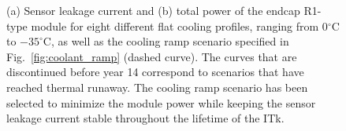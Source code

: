 \begin{figure}[ht]
\centering
{}\quad\quad
{}
\caption{(a) Sensor leakage current and (b) total power of the endcap R1-type module for eight different flat cooling profiles, ranging from 0$^\circ$C to $-35^\circ$C, as well as the cooling ramp scenario specified in Fig.~\ref{fig:coolant_ramp} (dashed curve). The curves that are discontinued before year 14 correspond to scenarios that have reached thermal runaway. The cooling ramp scenario has been selected to minimize the module power while keeping the sensor leakage current stable throughout the lifetime of the ITk.}
\label{fig:rampoptimization}
\end{figure}
